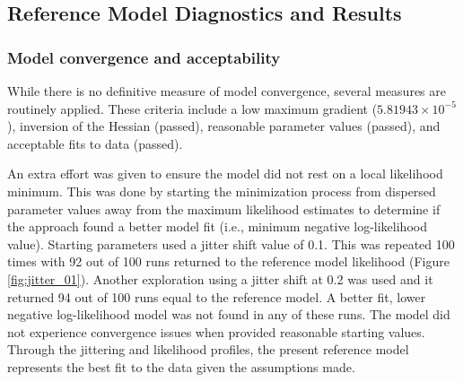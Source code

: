 \documentclass[11pt,
  english,
  a4paper,
]{article}
\begin{document}
\leavevmode\tagmcend\tagstructend\par


\hypertarget{reference-model-diagnostics-and-results}{%
\subsection{Reference Model Diagnostics and Results}\label{reference-model-diagnostics-and-results}}

\leavevmode\tagmcend\tagstructend


\hypertarget{model-convergence-and-acceptability}{%
\subsubsection{Model convergence and acceptability}\label{model-convergence-and-acceptability}}

\leavevmode\tagmcend\tagstructend


While there is no definitive measure of model convergence, several measures are routinely applied. These criteria include a low maximum gradient (\ensuremath{5.81943\times 10^{-5}}), inversion of the Hessian (passed), reasonable parameter values (passed), and acceptable fits to data (passed).

\leavevmode\tagmcend\tagstructend\par


An extra effort was given to ensure the model did not rest on a local likelihood minimum. This was done by starting the minimization process from dispersed parameter values away from the maximum likelihood estimates to determine if the approach found a better model fit (i.e., minimum negative log-likelihood value). Starting parameters used a jitter shift value of 0.1. This was repeated 100 times with 92 out of 100 runs returned to the reference model likelihood (Figure \ref{fig:jitter_01}). Another exploration using a jitter shift at 0.2 was used and it returned 94 out of 100 runs equal to the reference model. A better fit, lower negative log-likelihood model was not found in any of these runs. The model did not experience convergence issues when provided reasonable starting values. Through the jittering and likelihood profiles, the present reference model represents the best fit to the data given the assumptions made.
\end{document}
